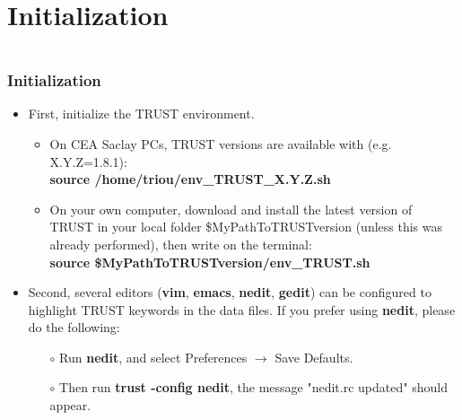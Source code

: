 \documentclass[10pt, hyperref={unicode=true,pdfusetitle, bookmarks=true,bookmarksnumbered=false,bookmarksopen=false, breaklinks=false,pdfborder={0 0 1},backref=true,colorlinks=true,linkcolor=darkblue,pageanchor}]{beamer}
\begin{document}
\section{{\bf{Initialization}}}
\begin{frame}
\begin{small}
\begin{columns}[c] 
\tableofcontents[sections={1-9},currentsection, currentsubsection]
\tableofcontents[sections={10-16},currentsection, currentsubsection]
\end{columns}
\end{small}
\end{frame}
\begin{frame}
\frametitle{Initialization}
\begin{block}{}

\begin{itemize}
\item First, initialize the TRUST environment. 
\begin{itemize}
\item On CEA Saclay PCs, TRUST versions are available with (e.g. X.Y.Z=1.8.1):\\
\textbf{source  /home/triou/env\_TRUST\_X.Y.Z.sh}
\item On your own computer, download and install the latest version of TRUST in your local folder \$MyPathToTRUSTversion (unless this was already performed), then write on the terminal:\\
\textbf{source  \$MyPathToTRUSTversion/env\_TRUST.sh}
\end{itemize}

\item Second, several editors (\textbf{vim}, \textbf{emacs}, \textbf{nedit}, \textbf{gedit}) can be configured to highlight TRUST keywords in the data files. If you prefer using \textbf{nedit}, please do the following:

    \begin{itemize}
    \item [$\circ$] Run \textbf{nedit}, and select Preferences $\rightarrow$ Save Defaults.
    \item [$\circ$] Then run \textbf{trust -config nedit}, the message "nedit.rc updated" should appear.
    \end{itemize}
\end{itemize}

\end{block}
\end{frame}
\end{document}
